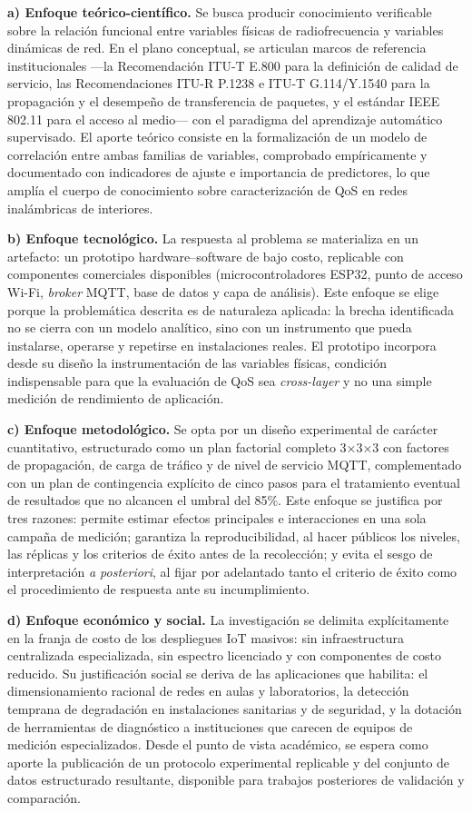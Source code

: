 \documentclass[
  12pt,
]{article}
\begin{document}
\textbf{a) Enfoque teórico-científico.} Se busca producir conocimiento
verificable sobre la relación funcional entre variables físicas de
radiofrecuencia y variables dinámicas de red. En el plano conceptual, se
articulan marcos de referencia institucionales —la Recomendación ITU-T
E.800 para la definición de calidad de servicio, las Recomendaciones
ITU-R P.1238 e ITU-T G.114/Y.1540 para la propagación y el desempeño de
transferencia de paquetes, y el estándar IEEE 802.11 para el acceso al
medio— con el paradigma del aprendizaje automático supervisado. El
aporte teórico consiste en la formalización de un modelo de correlación
entre ambas familias de variables, comprobado empíricamente y
documentado con indicadores de ajuste e importancia de predictores, lo
que amplía el cuerpo de conocimiento sobre caracterización de QoS en
redes inalámbricas de interiores.

\textbf{b) Enfoque tecnológico.} La respuesta al problema se materializa
en un artefacto: un prototipo hardware–software de bajo costo,
replicable con componentes comerciales disponibles (microcontroladores
ESP32, punto de acceso Wi-Fi, \emph{broker} MQTT, base de datos y capa
de análisis). Este enfoque se elige porque la problemática descrita es
de naturaleza aplicada: la brecha identificada no se cierra con un
modelo analítico, sino con un instrumento que pueda instalarse, operarse
y repetirse en instalaciones reales. El prototipo incorpora desde su
diseño la instrumentación de las variables físicas, condición
indispensable para que la evaluación de QoS sea \emph{cross-layer} y no
una simple medición de rendimiento de aplicación.

\textbf{c) Enfoque metodológico.} Se opta por un diseño experimental de
carácter cuantitativo, estructurado como un plan factorial completo
3×3×3 con factores de propagación, de carga de tráfico y de nivel de
servicio MQTT, complementado con un plan de contingencia explícito de
cinco pasos para el tratamiento eventual de resultados que no alcancen
el umbral del 85\%. Este enfoque se justifica por tres razones: permite
estimar efectos principales e interacciones en una sola campaña de
medición; garantiza la reproducibilidad, al hacer públicos los niveles,
las réplicas y los criterios de éxito antes de la recolección; y evita
el sesgo de interpretación \emph{a posteriori}, al fijar por adelantado
tanto el criterio de éxito como el procedimiento de respuesta ante su
incumplimiento.

\textbf{d) Enfoque económico y social.} La investigación se delimita
explícitamente en la franja de costo de los despliegues IoT masivos: sin
infraestructura centralizada especializada, sin espectro licenciado y
con componentes de costo reducido. Su justificación social se deriva de
las aplicaciones que habilita: el dimensionamiento racional de redes en
aulas y laboratorios, la detección temprana de degradación en
instalaciones sanitarias y de seguridad, y la dotación de herramientas
de diagnóstico a instituciones que carecen de equipos de medición
especializados. Desde el punto de vista académico, se espera como aporte
la publicación de un protocolo experimental replicable y del conjunto de
datos estructurado resultante, disponible para trabajos posteriores de
validación y comparación.
\end{document}
